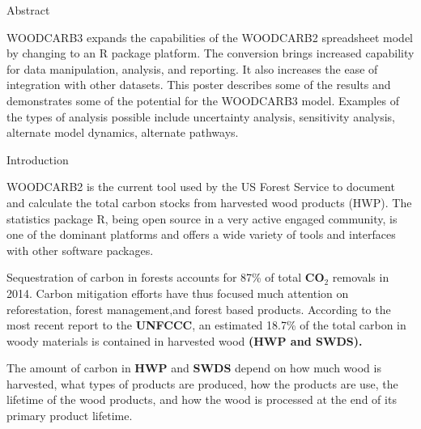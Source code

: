 \documentclass[final]{beamer}\usepackage[]{graphicx}\usepackage[]{color}
\newlength{\onecolwid}
\begin{document}
\begin{frame}[t]
\begin{columns}[t]
\begin{column}{\onecolwid}

\begin{alertblock}{Abstract}

WOODCARB3 expands the capabilities of the WOODCARB2 spreadsheet model by changing to an R package platform. The conversion brings increased capability for data manipulation, analysis, and reporting. It also increases the ease of integration with other datasets. This poster describes some of the results and demonstrates some of the potential for the WOODCARB3 model. Examples of the types of analysis possible include uncertainty analysis, sensitivity analysis, alternate model dynamics, alternate pathways.

\vspace{0ex}

\end{alertblock}
\begin{block}{Introduction}


WOODCARB2 is the current tool used by the US Forest Service to document and calculate the total carbon stocks from harvested wood products (HWP). The statistics package R, being open source in a very active engaged community, is one of the dominant platforms and offers a wide variety of tools and interfaces with other software packages.
\vspace{1ex}

Sequestration of carbon in forests accounts for 87\% of total \textbf{CO$_{2}$} removals in 2014. Carbon mitigation efforts have thus focused much attention on reforestation, forest management,and forest based products. According to the most recent report to the \textbf{UNFCCC}, an estimated 18.7\% of the total carbon in woody materials is contained in harvested wood \textbf{(HWP and SWDS).}
\vspace{1ex}  

The amount of carbon in \textbf{HWP} and \textbf{SWDS} depend on how much wood is harvested, what types of products are produced, how the products are use, the lifetime of the wood products, and how the wood is processed at the end of its primary product lifetime.




\end{block}
\end{column}
\end{columns}
\end{frame}
\end{document}
